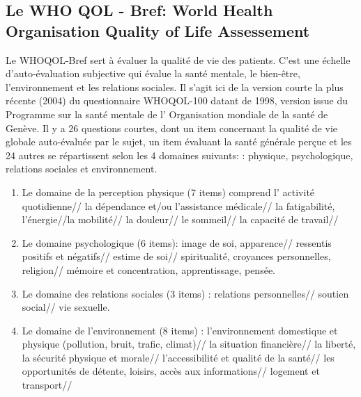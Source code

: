  \subsection{Le WHO QOL - Bref:  World Health
   Organisation Quality of Life Assessement }
 
Le  WHOQOL-Bref sert à évaluer la qualité de vie des patients. C'est une échelle
d'auto-évaluation subjective qui évalue la santé mentale, le
bien-être, l'environnement et les relations sociales.
Il s'agit ici de la version courte  la plus récente (2004) du questionnaire
 WHOQOL-100 datant de 1998, version issue du Programme sur la santé
 mentale de l'
Organisation mondiale de la santé de Genève. Il y a 26 questions
courtes, dont un item concernant la qualité de vie globale
auto-évaluée par le sujet, un item évaluant la santé générale perçue
et les 24 autres se répartissent selon les 4 domaines suivants:  
: physique, psychologique, relations sociales et environnement.
\begin{enumerate}
\item  Le domaine de la perception physique (7 items) comprend l' activité quotidienne// la dépendance et/ou l'assistance médicale// la fatigabilité, l'énergie//la mobilité// la douleur// le sommeil// la capacité de travail//
	
\item Le domaine psychologique (6 items):  image de soi, apparence// ressentis positifs et négatifs// estime de soi// spiritualité, croyances personnelles, religion// mémoire et concentration, apprentissage, pensée.
		
\item Le domaine des relations sociales (3 items) : relations personnelles// soutien social// vie sexuelle.
			
\item Le domaine de l'environnement (8 items) :
                         l'environnement domestique et physique
                         (pollution, bruit, trafic, climat)// la
                         situation financière//  la liberté, la
                         sécurité physique et morale//
                         l'accessibilité et qualité de la santé// les
                         opportunités de détente, loisirs, accès aux
                         informations// logement et transport// 
\end{enumerate}
		
	


